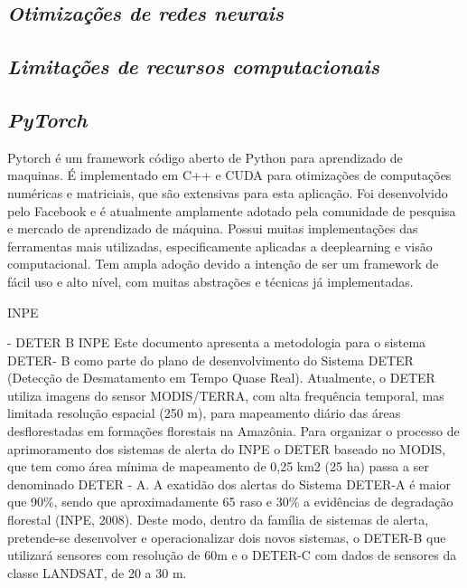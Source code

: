 \subsection{\textit{Otimizações de redes neurais}}\label{sec:Cap2_compressao}



\subsection{\textit{Limitações de recursos computacionais}}\label{sec:Cap2_trabalhos}



\subsection{\textit{PyTorch}}\label{sec:Cap2_PyTorch}
Pytorch é um framework código aberto de Python para aprendizado de maquinas. É implementado em C++ e CUDA para otimizações de computações numéricas e matriciais, que são extensivas para esta aplicação.
Foi desenvolvido pelo Facebook e é atualmente amplamente adotado pela comunidade de pesquisa e mercado de aprendizado de máquina. Possui muitas implementações das ferramentas mais utilizadas, especificamente aplicadas a deeplearning e visão computacional. Tem ampla adoção devido a intenção de ser um framework de fácil uso e alto nível, com muitas abstrações e técnicas já implementadas.



INPE 


- DETER B INPE Este documento apresenta a metodologia para o sistema DETER- B como parte
do plano de desenvolvimento do Sistema DETER (Detecção de Desmatamento em
Tempo Quase Real). Atualmente, o DETER utiliza imagens do sensor MODIS/TERRA,
com alta frequência temporal, mas limitada resolução espacial (250 m), para
mapeamento diário das áreas desflorestadas em formações florestais na Amazônia.
Para organizar o processo de aprimoramento dos sistemas de alerta do INPE o DETER
baseado no MODIS, que tem como área mínima de mapeamento de 0,25 km2 (25 ha)
passa a ser denominado DETER - A. A exatidão dos alertas do Sistema DETER-A é maior
que 90\%, sendo que aproximadamente 65%
raso e 30\% a evidências de degradação florestal (INPE, 2008).
Deste modo, dentro da família de sistemas de alerta, pretende-se desenvolver e
operacionalizar dois novos sistemas, o DETER-B que utilizará sensores com resolução
de 60m e o DETER-C com dados de sensores da classe LANDSAT, de 20 a 30 m.


